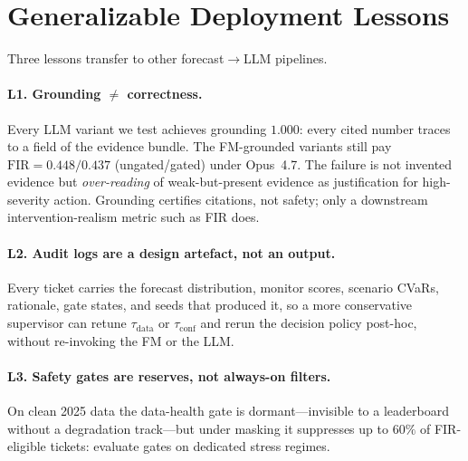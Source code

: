 \section{Generalizable Deployment Lessons}
\label{sec:lessons}

Three lessons transfer to other forecast$\to$LLM pipelines.

\paragraph{L1. Grounding $\ne$ correctness.}
Every LLM variant we test achieves grounding $1.000$: every
cited number traces to a field of the evidence bundle. The
FM-grounded variants still pay
$\mathrm{FIR}\!=\!0.448/0.437$ (ungated/gated) under Opus~4.7. The
failure is not invented evidence but \emph{over-reading} of
weak-but-present evidence as justification for high-severity
action. Grounding certifies citations, not safety; only a
downstream intervention-realism metric such as FIR does.

\paragraph{L2. Audit logs are a design artefact, not an output.}
Every ticket carries the forecast distribution, monitor scores,
scenario CVaRs, rationale, gate states, and seeds that produced
it, so a more conservative supervisor can retune
$\tau_{\mathrm{data}}$ or $\tau_{\mathrm{conf}}$ and rerun the
decision policy post-hoc, without re-invoking the FM or the LLM.

\paragraph{L3. Safety gates are reserves, not always-on filters.}
On clean 2025 data the data-health gate is dormant---invisible to
a leaderboard without a degradation track---but under masking it
suppresses up to $60\%$ of FIR-eligible tickets: evaluate gates on
dedicated stress regimes.

